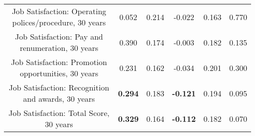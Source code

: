 \begin{longtable}{c c c c c c}
Job Satisfaction: Operating polices/procedure, 30 years & 0.052 & 0.214 &  -0.022 & 0.163 & 0.770 \\
Job Satisfaction: Pay and renumeration, 30 years & 0.390 & 0.174 &  -0.003 & 0.182 & 0.135 \\
Job Satisfaction: Promotion opportunities, 30 years & 0.231 & 0.162 &  -0.034 & 0.201 & 0.300 \\
Job Satisfaction: Recognition and awards, 30 years & \textbf{0.294} & 0.183 &  \textbf{-0.121} & 0.194 & 0.095 \\
Job Satisfaction: Total Score, 30 years & \textbf{0.329} & 0.164 &  \textbf{-0.112} & 0.182 & 0.070 \\
\bottomrule
\end{longtable}
